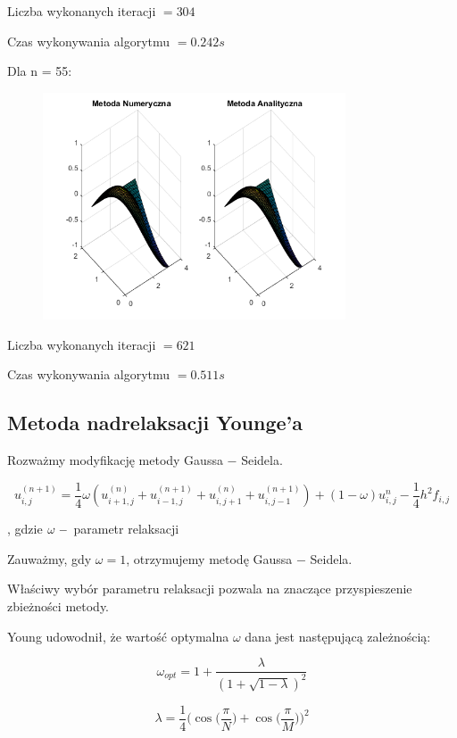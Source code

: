 Liczba wykonanych iteracji $ = 304 $

Czas wykonywania algorytmu $ = 0.242 s$

Dla n = 55:

\begin{figure}[!ht]
	\begin{center}
		\includegraphics[width=0.8\textwidth]{Lab6/charts/gs/zad2/55.png}
	\end{center}
\end{figure}

Liczba wykonanych iteracji $ = 621 $

Czas wykonywania algorytmu $ = 0.511 s$

\subsection{Metoda nadrelaksacji Younge'a}

Rozważmy modyfikację metody Gaussa $-$ Seidela.

$$u_{i,j}^{(n+1)} = \frac{1}{4}\omega(u_{i+1,j}^{(n)} + u_{i-1,j}^{(n+1)} + u_{i,j+1}^{(n)} + u_{i,j-1}^{(n+1)}) + (1-\omega)u^n_{i,j} - \frac{1}{4}h^2f_{i,j}$$

, gdzie $\omega \hspace{0.1cm} -$ parametr relaksacji

Zauważmy, gdy $\omega = 1$, otrzymujemy metodę Gaussa $-$ Seidela. 

Właściwy wybór parametru relaksacji pozwala na znaczące przyspieszenie zbieżności metody.

Young udowodnił, że wartość optymalna $\omega$ dana jest następującą zależnością:

$$\omega_{opt}=1+\dfrac{\lambda}{(1+\sqrt{1-\lambda})^2}$$

$$\lambda = \dfrac{1}{4}\Big(\cos\Big(\dfrac{\pi}{N}\Big) + \cos\Big(\dfrac{\pi}{M}\Big)\Big)^2$$

